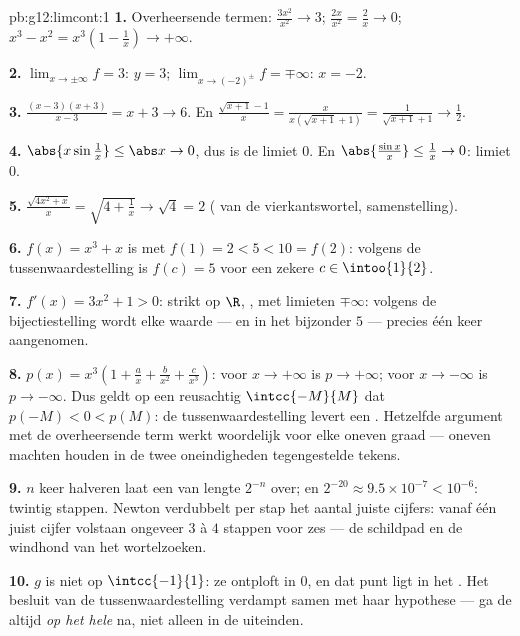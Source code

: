 \begin{solution}{pb:g12:limcont:1}
\textbf{1.} Overheersende termen: $\frac{3x^2}{x^2} \to 3$;
$\frac{2x}{x^2} = \frac2x \to 0$;
$x^3 - x^2 = x^3\left(1 - \frac1x\right) \to +\infty$.

\textbf{2.} $\lim_{x \to \pm\infty} f = 3$:  $y = 3$;
$\lim_{x \to (-2)^\pm} f = \mp\infty$:  $x = -2$.

\textbf{3.} $\frac{(x-3)(x+3)}{x - 3} = x + 3 \to 6$. En
$\frac{\sqrt{x+1} - 1}{x} = \frac{x}{x(\sqrt{x+1} + 1)} =
\frac{1}{\sqrt{x+1} + 1} \to \frac12$.

\textbf{4.} $\abs{x \sin\frac1x} \leq \abs x \to 0$, dus is de limiet $0$. En
$\abs{\frac{\sin x}{x}} \leq \frac1x \to 0$: limiet $0$.

\textbf{5.} $\frac{\sqrt{4x^2 + x}}{x} = \sqrt{4 + \frac1x} \to \sqrt4 = 2$
( van de vierkantswortel, samenstelling).

\textbf{6.} $f(x) = x^3 + x$ is  met $f(1) = 2 < 5 < 10 = f(2)$:
volgens de tussenwaardestelling is $f(c) = 5$ voor een zekere
$c \in \intoo{1}{2}$.

\textbf{7.} $f'(x) = 3x^2 + 1 > 0$: strikt  op $\R$, , met
limieten $\mp\infty$: volgens de bijectiestelling wordt elke waarde --- en in
het bijzonder $5$ --- precies één keer aangenomen.

\textbf{8.} $p(x) = x^3\left(1 + \frac ax + \frac{b}{x^2} +
\frac{c}{x^3}\right)$: voor $x \to +\infty$ is $p \to +\infty$; voor
$x \to -\infty$ is $p \to -\infty$. Dus geldt op een reusachtig 
$\intcc{-M}{M}$ dat $p(-M) < 0 < p(M)$: de tussenwaardestelling levert een
. Hetzelfde argument met de overheersende term werkt woordelijk voor
elke oneven graad --- oneven machten houden in de twee oneindigheden
tegengestelde tekens.

\textbf{9.} $n$ keer halveren laat een  van lengte $2^{-n}$ over; en
$2^{-20} \approx 9.5 \times 10^{-7} < 10^{-6}$: twintig stappen. Newton
verdubbelt per stap het aantal juiste cijfers: vanaf één juist cijfer
volstaan ongeveer $3$ à $4$ stappen voor zes --- de schildpad en de windhond
van het wortelzoeken.

\textbf{10.} $g$ is niet  op $\intcc{-1}{1}$: ze ontploft in $0$, en
dat punt ligt in het . Het besluit van de tussenwaardestelling
verdampt samen met haar hypothese --- ga de  altijd \emph{op het
hele } na, niet alleen in de uiteinden.


\end{solution}
